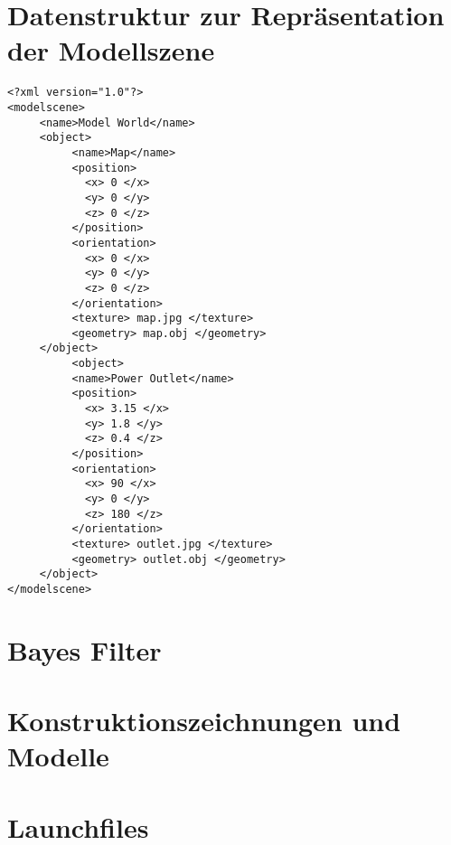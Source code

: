 \section{Datenstruktur zur Repräsentation der Modellszene}
\label{app.datastructure}
\begin{lstlisting}[label=source.data,caption=Datenstruktur zur Repräsentation der Modellszene]
<?xml version="1.0"?>
<modelscene>
     <name>Model World</name>
     <object>
          <name>Map</name>
          <position>
          	<x> 0 </x>
          	<y> 0 </y>
          	<z> 0 </z>
          </position>
          <orientation>
          	<x> 0 </x>
          	<y> 0 </y>
          	<z> 0 </z>
          </orientation>
          <texture> map.jpg </texture>
          <geometry> map.obj </geometry>
     </object>
          <object>
          <name>Power Outlet</name>
          <position>
          	<x> 3.15 </x>
          	<y> 1.8 </y>
          	<z> 0.4 </z>
          </position>
          <orientation>
          	<x> 90 </x>
          	<y> 0 </y>
          	<z> 180 </z>
          </orientation>
          <texture> outlet.jpg </texture>
          <geometry> outlet.obj </geometry>
     </object>
</modelscene>
\end{lstlisting}

\clearpage{}

\section{Bayes Filter}
\label{app:bayes}

\clearpage{}

\section{Konstruktionszeichnungen und Modelle}
\label{app:construction}

\clearpage{}

\section{Launchfiles}
\label{app:launchfiles}